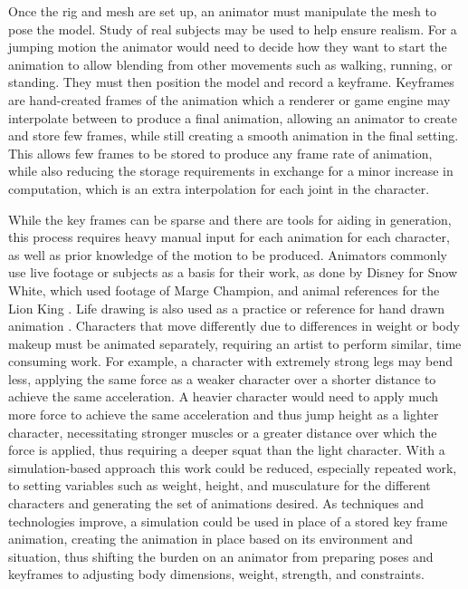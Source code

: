 Once the rig and mesh are set up, an animator must manipulate the mesh to pose the model.  Study of real subjects may be used to help ensure realism.  For a jumping motion the animator would need to decide how they want to start the animation to allow blending from other movements such as walking, running, or standing.  They must then position the model and record a keyframe.  Keyframes are hand-created frames of the animation which a renderer or game engine may interpolate between to produce a final animation, allowing an animator to create and store few frames, while still creating a smooth animation in the final setting.  This allows few frames to be stored to produce any frame rate of animation, while also reducing the storage requirements in exchange for a minor increase in computation, which is an extra interpolation for each joint in the character.

While the key frames can be sparse and there are tools for aiding in generation, this process requires heavy manual input for each animation for each character, as well as prior knowledge of the motion to be produced.  Animators commonly use live footage or subjects as a basis for their work, as done by Disney for Snow White, which used footage of Marge Champion, and animal references for the Lion King \cite{disney_art, disney_hist}.  Life drawing is also used as a practice or reference for hand drawn animation \cite{camara_anim_tech}. Characters that move differently due to differences in weight or body makeup must be animated separately, requiring an artist to perform similar, time consuming work.  For example, a character with extremely strong legs may bend less, applying the same force as a weaker character over a shorter distance to achieve the same acceleration.  A heavier character would need to apply much more force to achieve the same acceleration and thus jump height as a lighter character, necessitating stronger muscles or a greater distance over which the force is applied, thus requiring a deeper squat than the light character.  With a simulation-based approach this work could be reduced, especially repeated work, to setting variables such as weight, height, and musculature for the different characters and generating the set of animations desired.  As techniques and technologies improve, a simulation could be used in place of a stored key frame animation, creating the animation in place based on its environment and situation, thus shifting the burden on an animator from preparing poses and keyframes to adjusting body dimensions, weight, strength, and constraints.

